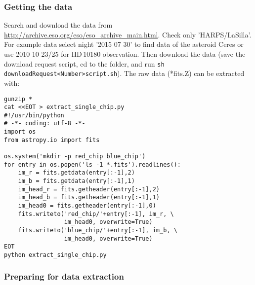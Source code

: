 \documentclass[10pt,a4paper]{article}
\begin{document}
\subsubsection{Getting the data}
Search and download the data from \url{http://archive.eso.org/eso/eso_archive_main.html}. Check only 'HARPS/LaSilla'. For example data select night '2015 07 30' to find data of the asteroid Ceres or use 2010 10 23/25 for HD\,10180 observation. Then download the data (save the download request script, cd to the folder, and run \verb|sh  downloadRequest<Number>script.sh|). The raw data (*fits.Z) can be extracted with:
\begin{lstlisting}[style=base]
gunzip *
cat <<EOT > extract_single_chip.py
#!/usr/bin/python
# -*- coding: utf-8 -*-
import os
from astropy.io import fits

os.system('mkdir -p red_chip blue_chip')
for entry in os.popen('ls -1 *.fits').readlines():
    im_r = fits.getdata(entry[:-1],2)
    im_b = fits.getdata(entry[:-1],1)
    im_head_r = fits.getheader(entry[:-1],2)
    im_head_b = fits.getheader(entry[:-1],1)
    im_head0 = fits.getheader(entry[:-1],0)
    fits.writeto('red_chip/'+entry[:-1], im_r, \
                 im_head0, overwrite=True)
    fits.writeto('blue_chip/'+entry[:-1], im_b, \
                 im_head0, overwrite=True)
EOT
python extract_single_chip.py
\end{lstlisting}


\subsubsection{Preparing for data extraction}
\end{document}
